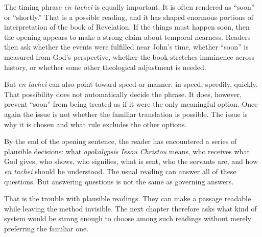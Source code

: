 The timing phrase \textit{en tachei} is equally important. It is often rendered as ``soon'' or ``shortly.'' That is a possible reading, and it has shaped enormous portions of interpretation of the book of Revelation. If the things must happen soon, then the opening appears to make a strong claim about temporal nearness. Readers then ask whether the events were fulfilled near John's time, whether ``soon'' is measured from God's perspective, whether the book stretches imminence across history, or whether some other theological adjustment is needed.

But \textit{en tachei} can also point toward speed or manner: in speed, speedily, quickly. That possibility does not automatically decide the phrase. It does, however, prevent ``soon'' from being treated as if it were the only meaningful option. Once again the issue is not whether the familiar translation is possible. The issue is why it is chosen and what rule excludes the other options.

By the end of the opening sentence, the reader has encountered a series of plausible decisions: what \textit{apokalypsis Iesou Christou} means, who receives what God gives, who shows, who signifies, what is sent, who the servants are, and how \textit{en tachei} should be understood. The usual reading can answer all of these questions. But answering questions is not the same as governing answers.

That is the trouble with plausible readings. They can make a passage readable while leaving the method invisible. The next chapter therefore asks what kind of system would be strong enough to choose among such readings without merely preferring the familiar one.
